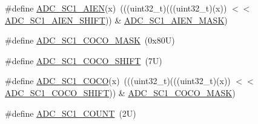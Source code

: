 \begin{DoxyCompactItemize}
\#define \mbox{\hyperlink{group___a_d_c___register___masks_ga63500f6af77c0494e67395a35716285b}{A\+D\+C\+\_\+\+S\+C1\+\_\+\+A\+I\+EN}}(x)~(((uint32\+\_\+t)(((uint32\+\_\+t)(x)) $<$$<$ \mbox{\hyperlink{group___a_d_c___register___masks_gaf2cde8fb207dd348e6313d6d0a5b3761}{A\+D\+C\+\_\+\+S\+C1\+\_\+\+A\+I\+E\+N\+\_\+\+S\+H\+I\+FT}})) \& \mbox{\hyperlink{group___a_d_c___register___masks_gaa698d898e077003de10a42184de8f124}{A\+D\+C\+\_\+\+S\+C1\+\_\+\+A\+I\+E\+N\+\_\+\+M\+A\+SK}})
\item 
\#define \mbox{\hyperlink{group___a_d_c___register___masks_ga698a3a178a5b412febc8c0cc849e8896}{A\+D\+C\+\_\+\+S\+C1\+\_\+\+C\+O\+C\+O\+\_\+\+M\+A\+SK}}~(0x80\+U)
\item 
\#define \mbox{\hyperlink{group___a_d_c___register___masks_gad708b138ec734a371a20a990f0c9a27f}{A\+D\+C\+\_\+\+S\+C1\+\_\+\+C\+O\+C\+O\+\_\+\+S\+H\+I\+FT}}~(7\+U)
\item 
\#define \mbox{\hyperlink{group___a_d_c___register___masks_ga9393e3e7b4f420e8871e93d81302ddef}{A\+D\+C\+\_\+\+S\+C1\+\_\+\+C\+O\+CO}}(x)~(((uint32\+\_\+t)(((uint32\+\_\+t)(x)) $<$$<$ \mbox{\hyperlink{group___a_d_c___register___masks_gad708b138ec734a371a20a990f0c9a27f}{A\+D\+C\+\_\+\+S\+C1\+\_\+\+C\+O\+C\+O\+\_\+\+S\+H\+I\+FT}})) \& \mbox{\hyperlink{group___a_d_c___register___masks_ga698a3a178a5b412febc8c0cc849e8896}{A\+D\+C\+\_\+\+S\+C1\+\_\+\+C\+O\+C\+O\+\_\+\+M\+A\+SK}})
\item 
\#define \mbox{\hyperlink{group___a_d_c___register___masks_gad1b5275cc9fbdba08614fca93c5e30ef}{A\+D\+C\+\_\+\+S\+C1\+\_\+\+C\+O\+U\+NT}}~(2\+U)
\end{DoxyCompactItemize}
